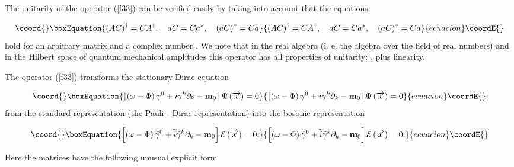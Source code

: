 \documentclass[a4paper,12pt]{article}
\begin{document}
The unitarity of the operator (\ref{f33}) can be verified easily by taking
into account that the equations

\begin{equation}\coord{}\boxEquation{
\left( AC\right) ^{\dagger }=CA^{\dagger },\quad aC=Ca^{*},\quad \left(
aC\right) ^{*}=Ca  \label{f34}
}{
\left( AC\right) ^{\dagger }=CA^{\dagger },\quad aC=Ca^{*},\quad \left(
aC\right) ^{*}=Ca  }{ecuacion}\coordE{}\end{equation}
hold for an arbitrary matrix \coordHE{} and a complex number \coordHE{}. We note that in
the real algebra (i. e. the algebra over the field of real numbers) and in
the Hilbert space of quantum mechanical amplitudes this operator has all
properties of unitarity: \coordHE{}  \coordHE{}, plus
linearity.

The operator (\ref{f33}) transforms the stationary Dirac equation

\begin{equation}\coord{}\boxEquation{  \label{f35}
\left[ \left( \omega -\Phi \right) \gamma ^0+i\gamma ^k\partial _k-\mathbf{m}
_0\right] \Psi \left( \overrightarrow{x}\right) =0
}{  \left[ \left( \omega -\Phi \right) \gamma ^0+i\gamma ^k\partial _k-\mathbf{m}
_0\right] \Psi \left( \overrightarrow{x}\right) =0
}{ecuacion}\coordE{}\end{equation}
from the standard representation (the Pauli - Dirac representation) into the
bosonic representation

\begin{equation}\coord{}\boxEquation{  \label{f36}
\left[ \left( \omega -\Phi \right) \widetilde{\gamma }^0+\widetilde{i}
\widetilde{\gamma }^k\partial _k-\mathbf{m}_0\right] \mathcal{E}\left(
\overrightarrow{x}\right) =0.
}{  \left[ \left( \omega -\Phi \right) \widetilde{\gamma }^0+\widetilde{i}
\widetilde{\gamma }^k\partial _k-\mathbf{m}_0\right] \mathcal{E}\left(
\overrightarrow{x}\right) =0.
}{ecuacion}\coordE{}\end{equation}

Here the \myHighlight{$\widetilde{\gamma }^\mu $}\coordHE{} matrices have the following unusual
explicit form
\end{document}
